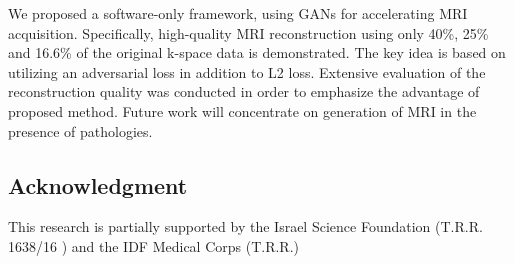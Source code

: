 \documentclass[review]{elsarticle}
\begin{document}
We proposed a software-only framework, using GANs for accelerating MRI acquisition. Specifically, high-quality MRI reconstruction using only 40\%, 25\% and 16.6\% of the original k-space data is demonstrated. The key idea is based on utilizing an adversarial loss in addition to L2 loss. Extensive evaluation of the reconstruction quality was conducted in order to emphasize the advantage of proposed method.
Future work will concentrate on generation of MRI in the presence of pathologies.


\subsection{Acknowledgment}
This research is partially supported by the Israel Science Foundation (T.R.R. 1638/16 ) and the IDF Medical Corps (T.R.R.)
\end{document}
